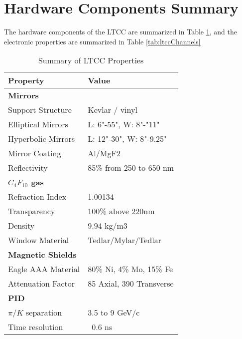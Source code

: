 \section{Hardware Components Summary}


The hardware components of the LTCC are summarized in Table \ref{tab:ltccProperties}, and the electronic properties
are summarized in Table \ref{tab:ltccChannels}

\begin{table}[h]
	\begin{center}
		\begin{tabular}{| l | l |}
			\hline \hline
			Property                 & Value \\
			\hline
			{\bf Mirrors}            &                               \\
			Support Structure        & Kevlar / vinyl                \\
			Elliptical Mirrors       & L: 6"-55", W: 8"-"11"         \\
			Hyperbolic Mirrors       & L: 12"-30", W: 8"-9.25"       \\
			Mirror Coating           & Al/MgF2                       \\
			Reflectivity             & 85\% from 250 to 650 nm       \\
			{\bf $C_4F_{10}$ gas}    &                               \\
			Refraction Index         & 1.00134                       \\
			Transparency             & 100\% above 220nm             \\
			Density                  & 9.94 kg/m3                    \\
			Window Material          & Tedlar/Mylar/Tedlar           \\
			{\bf Magnetic Shields}   &                               \\
			Eagle AAA Material       & 80\% Ni, 4\% Mo, 15\% Fe      \\
			Attenuation Factor       &  85 Axial, 390 Transverse     \\
			{\bf PID}                &                               \\
			$\pi/K$ separation       &  3.5 to 9 GeV/c               \\
			Time resolution          &  ~0.6 ns                      \\
			\hline \hline
		\end{tabular}
	\end{center}
\caption{Summary of LTCC Properties}\label{tab:ltccProperties}
\end{table}

